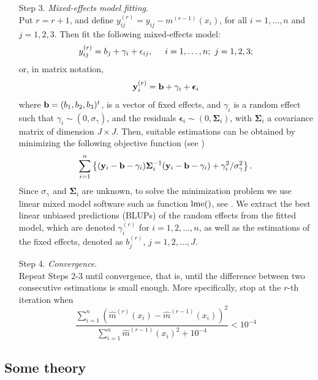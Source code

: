 \documentclass[sn-mathphys]{sn-jnl}%
\theoremstyle{thmstyleone}%
\theoremstyle{thmstyletwo}%
\theoremstyle{thmstylethree}%
\begin{document}
\begin{enumerate}
\item[Step 3.] \textit{Mixed-effects model fitting}. \\
\noindent Put $r=r+1$, and define $y_{ij}^{(r)}=y_{ij}-{m}^{(r-1)}(x_i)$, for all $i=1, \ldots, n$ and $j=1,2,3$. 
Then fit the following mixed-effects model:
\[
y_{ij}^{(r)}= b_j +\gamma_i + \epsilon_{ij}, \hspace{0.5cm} i=1, \ldots, n; \ j=1,2,3;
\]
or, in matrix notation,
\[
{\bf y}_{i}^{(r)} = {\bf b} +\gamma_i + {\boldsymbol \epsilon}_i
\]
where ${\bf b}=(b_1,b_2,b_3)^t$, is a vector of fixed effects, and $\gamma_i$ is a random effect such that $\gamma_i \sim (0, \sigma_{\gamma})$, and the residuals ${\boldsymbol \epsilon}_{i} \sim (0,{\mathbf \Sigma}_i)$, with ${\mathbf \Sigma}_i$ a covariance matrix of dimension $J \times J$. Then, suitable estimations can be obtained by minimizing the following objective function (see \cite{DG2003})
\[
\sum_{i=1}^n \left\{ ({\bf y}_i-{\bf b}-\gamma_i) {\mathbf \Sigma}_i^{-1}({\bf y}_i-{\bf b}-\gamma_i)+ \gamma_i^2/\sigma_{\gamma}^2\right\}.
\]
Since $\sigma_{\gamma}$ and ${\mathbf \Sigma}_{i}$ are unknown, to solve the minimization problem we use linear mixed model software such as function ${\rm lme} ()$, see \cite{PB2000}. We extract the 
 best linear unbiased predictions (BLUPs) of the random effects from the fitted model, which are denoted $\gamma_{i}^{(r)}$ for $i=1, 2, \ldots, n$, as well as the estimations of the fixed effects, denoted as $b_{j}^{(r)}$, $j=1,2,\ldots, J$. 

\item[Step 4.] \textit{Convergence}. \\
\noindent Repeat Steps 2-3 until convergence, that is, until the difference between two consecutive estimations is small enough. More specifically, stop at the $r$-th iteration when
{\small{
\[
\frac{\displaystyle{\sum_{i=1}^n} \left(\widehat{m}^{(r)}(x_i)-\widehat{m}^{(r-1)}(x_i)\right)^2}{\displaystyle{\sum_{i=1}^n}\widehat{m}^{(r-1)}(x_i)^2+10^{-4}}<10^{-4}
\]
}}
\end{enumerate}

\subsection{Some theory}
\end{document}
